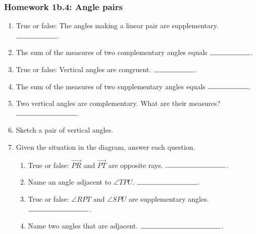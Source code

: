 \documentclass[12pt, oneside]{article}
\begin{document}
\subsubsection*{Homework 1b.4: Angle pairs} %
  \vspace{0.5cm}
  \begin{enumerate}

    \item True or false: The angles making a linear pair are supplementary. $\rule{2cm}{0.15mm}$. \bigskip
    \item The sum of the measures of two complementary angles equals $\rule{2cm}{0.15mm}$. \bigskip
    \item True or false: Vertical angles are congruent. $\rule{2cm}{0.15mm}$. \bigskip
    \item The sum of the measures of two supplementary angles equals $\rule{2cm}{0.15mm}$. \bigskip
    \item Two vertical angles are complementary. What are their measures? $\rule{3cm}{0.15mm}$. \bigskip
    \item Sketch a pair of vertical angles. \vspace{3cm}

      \item Given the situation in the diagram, answer each question. \vspace{1cm}
        \begin{flushright}
        \end{flushright}
      \begin{enumerate}
        \item True or false: $\overrightarrow{PR}$ and $\overrightarrow{PT}$ are opposite rays. $\rule{3cm}{0.15mm}$. \bigskip
        \item Name an angle adjacent to $\angle TPU$. $\rule{3cm}{0.15mm}$. \bigskip
        \item True or false: $\angle RPT$ and $\angle SPU$ are supplementary angles. $\rule{3cm}{0.15mm}$. \bigskip
        \item Name two angles that are adjacent. $\rule{4cm}{0.15mm}$. \bigskip
      \end{enumerate}


\end{enumerate}
\end{document}
